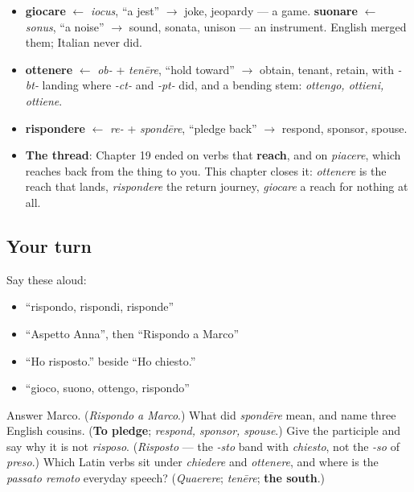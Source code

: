 \begin{grammarlens}[title={What you've built this chapter}]
\begin{itemize}
\raggedright
  \item \textbf{giocare} $\leftarrow$ \emph{iocus}, \textquotedblleft{}a jest\textquotedblright{} $\to$ joke, jeopardy — a game. \textbf{suonare} $\leftarrow$ \emph{sonus}, \textquotedblleft{}a noise\textquotedblright{} $\to$ sound, sonata, unison — an instrument. English merged them; Italian never did.
  \item \textbf{ottenere} $\leftarrow$ \emph{ob-} + \emph{tenēre}, \textquotedblleft{}hold toward\textquotedblright{} $\to$ obtain, tenant, retain, with \emph{-bt-} landing where \emph{-ct-} and \emph{-pt-} did, and a bending stem: \emph{ottengo, ottieni, ottiene}.
  \item \textbf{rispondere} $\leftarrow$ \emph{re-} + \emph{spondēre}, \textquotedblleft{}pledge back\textquotedblright{} $\to$ respond, sponsor, spouse.
  \item \textbf{The thread}: Chapter 19 ended on verbs that \textbf{reach}, and on \emph{piacere}, which reaches back from the thing to you. This chapter closes it: \emph{ottenere} is the reach that lands, \emph{rispondere} the return journey, \emph{giocare} a reach for nothing at all.
\end{itemize}
\end{grammarlens}

\subsection*{Your turn}
Say these aloud:

\begin{itemize}
\raggedright
  \item \textquotedblleft{}rispondo, rispondi, risponde\textquotedblright{}
  \item \textquotedblleft{}Aspetto Anna\textquotedblright{}, then \textquotedblleft{}Rispondo a Marco\textquotedblright{}
  \item \textquotedblleft{}Ho risposto.\textquotedblright{} beside \textquotedblleft{}Ho chiesto.\textquotedblright{}
  \item \textquotedblleft{}gioco, suono, ottengo, rispondo\textquotedblright{}
\end{itemize}

\begin{tcolorbox}[breakable,colback=teal!4,colframe=teal!35!black,title={Before you move on}]
Answer Marco. (\emph{Rispondo a Marco}.) What did \emph{spondēre} mean, and name three English cousins. (\textbf{To pledge}; \emph{respond, sponsor, spouse}.) Give the participle and say why it is not \emph{risposo}. (\emph{Risposto} — the \emph{-sto} band with \emph{chiesto}, not the \emph{-so} of \emph{preso}.) Which Latin verbs sit under \emph{chiedere} and \emph{ottenere}, and where is the \emph{passato remoto} everyday speech? (\emph{Quaerere}; \emph{tenēre}; \textbf{the south}.)
\end{tcolorbox}
